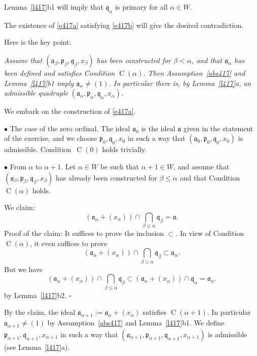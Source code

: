 \documentclass[parskip=half,fontsize=12pt]{scrartcl}%
\newcommand{\oo}{\operatorname}\newcommand{\ooo}{\operatorname*}
\newcommand{\mf}{\mathfrak}
\newcommand{\aaa}{\mf a}
\newcommand{\ppp}{\mf p}
\newcommand{\qqq}{\mf q}
\newcommand{\bu}{\bullet}
\begin{document}
Lemma~\ref{l417}b1 will imply that $\qqq_\alpha$ is primary for all $\alpha\in W$. 

The existence of \eqref{e417a} satisfying \eqref{e417b} will give the desired contradiction.

Here is the key point:

\emph{Assume that $(\aaa_\beta,\ppp_\beta,\qqq_\beta,x_\beta)$ has been constructed for $\beta<\alpha$, and that $\aaa_\alpha$ has been defined and satisfies Condition $\oo C(\alpha)$. Then Assumption~\eqref{abs417} and Lemma~\ref{l417}b1 imply $\aaa_\alpha\ne(1)$. In particular there is, by Lemma~\ref{l417}a, an admissible quadruple} $(\aaa_\alpha,\ppp_\alpha,\qqq_\alpha,x_\alpha)$.

We embark on the construction of \eqref{e417a}.

$\bu$ The case of the zero ordinal. The ideal $\aaa_0$ is the ideal $\aaa$ given in the statement of the exercise, and we choose $\ppp_0,\qqq_0,x_0$ in such a way that $(\aaa_0,\ppp_0,\qqq_0,x_0)$ is admissible. Condition~$\oo C(0)$ holds trivially.

$\bu$ From $\alpha$ to $\alpha+1$. Let $\alpha\in W$ be such that $\alpha+1\in W$, and assume that $(\aaa_\beta,\ppp_\beta,\qqq_\beta,x_\beta)$ has already been constructed for $\beta\le\alpha$ and that Condition $\oo C(\alpha)$ holds. 

We claim: 
$$
(\aaa_\alpha+(x_\alpha))\cap\bigcap_{\beta\le\alpha}\qqq_\beta=\aaa.
$$ 
Proof of the claim: It suffices to prove the inclusion $\subset$. In view of Condition $\oo C(\alpha)$, it even suffices to prove 
$$
(\aaa_\alpha+(x_\alpha))\cap\bigcap_{\beta\le\alpha}\qqq_\beta\subset\aaa_\alpha.
$$ 
But we have 
$$
(\aaa_\alpha+(x_\alpha))\cap\bigcap_{\beta\le\alpha}\qqq_\beta\subset(\aaa_\alpha+(x_\alpha))\cap\qqq_\alpha=\aaa_\alpha.
$$ 
by Lemma~\ref{l417}b2. $\square$

By the claim, the ideal $\aaa_{\alpha+1}:=\aaa_\alpha+(x_\alpha)$ satisfies $\oo C(\alpha+1)$. In particular $\aaa_{\alpha+1}\ne(1)$ by Assumption~\eqref{abs417} and Lemma~\ref{l417}b1. We define $\ppp_{\alpha+1},\qqq_{\alpha+1},x_{\alpha+1}$ in such a way that $(\aaa_{\alpha+1},\ppp_{\alpha+1},\qqq_{\alpha+1},x_{\alpha+1})$ is admissible (see Lemma~\ref{l417}a).

\end{document}
